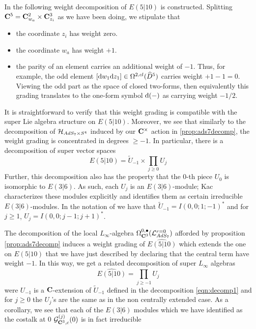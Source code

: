 \documentclass[../main.tex]{subfiles}
\begin{document}
In \cite{KR2} the following weight decomposition of $E(5|10)$ is constructed. Splitting $\mathbf{C}^5 = \mathbf{C}^2_{w_a}\times \mathbf{C}^3_{z_i}$ as we have been doing, we stipulate that
\begin{itemize} 
\item the coordinate $z_i$ has weight zero. 
\item the coordinate $w_a$ has weight $+1$.
\item the parity of an element carries an additional weight of $-1$. 
Thus, for example, the odd element $[\mathrm{d} w_1 \mathrm{d} z_1] \in \Omega^{2,cl}(\widehat{D}^5)$ carries weight $+1 - 1 = 0$. Viewing the odd part as the space of closed two-forms, then equivalently this grading translates to the one-form symbol $\mathrm{d}(-)$ as carrying weight $-1/2$.
\end{itemize} 

It is straightforward to verify that this weight grading is compatible with the super Lie algebra structure on $E(5|10)$. Moreover, we see that similarly to the decomposition of $\mathcal{H}_{AdS_7\times S^4}$ induced by our $\mathbf{C}^\times$ action in \ref{prop:ads7decomp}, the weight grading is concentrated in degrees $\geq -1$.  In particular, there is a decomposition of super vector spaces
\begin{equation}\label{eqn:decomp1}
E(5|10) = \tilde U_{-1} \times \prod_{j \geq 0} U_j 
\end{equation}
Further, this decomposition also has the property that the 0-th piece $U_0$ is isomorphic to $E(3|6)$. As such, each $U_j$ is an $E(3|6)$-module; Kac characterizes these modules explicitly and identifies them as certain irreducible $E(3|6)$-modules. In the notation of \cite{KR2} we have that $\tilde U_{-1} = I(0,0;1;-1)^*$ and for $j\geq 1$, $U_j = I(0,0;j-1;j+1)^*$. 

The decomposition of the local $L_\infty$-algebra $\Omega^{0,\bullet}_{\mathbf{C}^3}(\mathcal{L}^{r=0}_{AdS_7} )$ afforded by proposition \ref{prop:ads7decomp} induces a weight grading of $\widehat{E(5|10)}$ which extends the one on $E(5|10)$ that we have just described by declaring that the central term have weight $-1$.
In this way, we get a related decomposition of super $L_\infty$ algebras
\begin{equation}\label{eqn:decomp2}
\widehat{E(5|10)} = \prod_{j \geq -1} U_j            
\end{equation}                      
were $U_{-1}$ is a $\mathbf{C}$-extension of $\tilde U_{-1}$ defined in the decomposition \eqref{eqn:decomp1} and for $j \geq 0$ the $U_j$'s are the same as in the non centrally extended case. As a corollary, we see that each of the $E(3|6)$ modules which we have identified as the costalk at 0 $\mathcal{G}^{(j)}_{\mathbf{C}^3, c} (0)$ is in fact irreducible 
\end{document}
